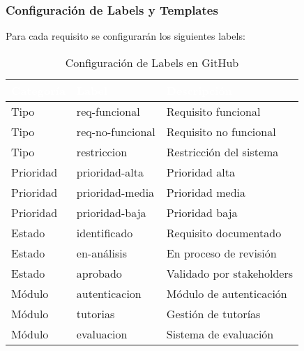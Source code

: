 \documentclass[12pt,a4paper]{article}
\begin{document}
\subsubsection{Configuración de Labels y Templates}

Para cada requisito se configurarán los siguientes labels:

\begin{table}[H]
\centering
\begin{tabular}{|p{3cm}|p{2cm}|p{6cm}|}
\hline
\rowcolor{headercolor}
\textcolor{white}{\textbf{Categoría}} & 
\textcolor{white}{\textbf{Label}} & 
\textcolor{white}{\textbf{Descripción}} \\
\hline

Tipo & req-funcional & Requisito funcional \\
\hline
\rowcolor{lightgray}

Tipo & req-no-funcional & Requisito no funcional \\
\hline

Tipo & restriccion & Restricción del sistema \\
\hline
\rowcolor{lightgray}

Prioridad & prioridad-alta & Prioridad alta \\
\hline

Prioridad & prioridad-media & Prioridad media \\
\hline
\rowcolor{lightgray}

Prioridad & prioridad-baja & Prioridad baja \\
\hline

Estado & identificado & Requisito documentado \\
\hline
\rowcolor{lightgray}

Estado & en-análisis & En proceso de revisión \\
\hline

Estado & aprobado & Validado por stakeholders \\
\hline
\rowcolor{lightgray}

Módulo & autenticacion & Módulo de autenticación \\
\hline

Módulo & tutorias & Gestión de tutorías \\
\hline
\rowcolor{lightgray}

Módulo & evaluacion & Sistema de evaluación \\
\hline

\end{tabular}
\caption{Configuración de Labels en GitHub}
\end{table}
\end{document}
